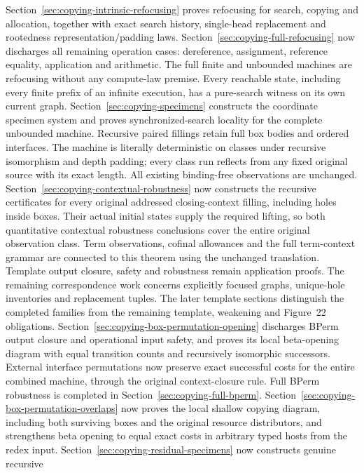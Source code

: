 Section~\ref{sec:copying-intrinsic-refocusing} proves refocusing for search,
copying and allocation, together with exact search history, single-head
replacement and rootedness representation/padding laws.
Section~\ref{sec:copying-full-refocusing} now discharges all remaining
operation cases: dereference, assignment, reference equality, application and
arithmetic. The full finite and unbounded machines are refocusing without any
compute-law premise. Every reachable state, including every finite prefix of
an infinite execution, has a pure-search witness on its own current graph.
Section~\ref{sec:copying-specimens} constructs the coordinate specimen system
and proves synchronized-search locality for the complete unbounded machine.
Recursive paired fillings retain full box bodies and ordered interfaces.
The machine is literally deterministic on classes under recursive isomorphism
and depth padding; every class run reflects from any fixed original source
with its exact length. All existing binding-free observations are unchanged.
Section~\ref{sec:copying-contextual-robustness} now constructs the recursive
certificates for every original addressed closing-context filling, including
holes inside boxes. Their actual initial states supply the required lifting,
so both quantitative contextual robustness conclusions cover the entire
original observation class. Term observations, cofinal allowances and the
full term-context grammar are connected to this theorem using the unchanged
translation. Template output closure, safety and robustness remain application
proofs. The remaining correspondence work concerns explicitly focused graphs,
unique-hole inventories and replacement tuples. The later template sections distinguish the completed families from the
remaining template, weakening and Figure~22 obligations.
Section~\ref{sec:copying-box-permutation-opening} discharges BPerm output
closure and operational input safety, and proves its local beta-opening diagram
with equal transition counts and recursively isomorphic successors. External
interface permutations now preserve exact successful costs for the entire
combined machine, through the original context-closure rule. Full BPerm robustness is completed in Section~\ref{sec:copying-full-bperm}. Section~\ref{sec:copying-box-permutation-overlaps}
now proves the local shallow copying diagram, including both surviving boxes
and the original resource distributors, and strengthens beta opening to equal
exact costs in arbitrary typed hosts from the redex input.
Section~\ref{sec:copying-residual-specimens} now constructs genuine recursive
